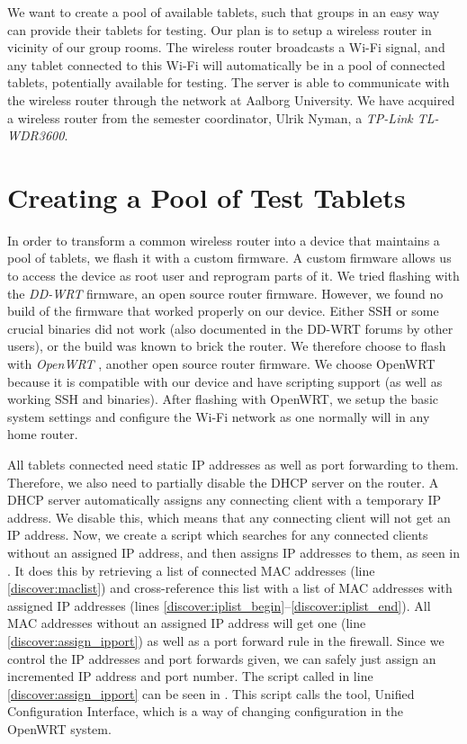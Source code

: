 We want to create a pool of available tablets, such that groups in an easy way can provide their tablets for testing. Our plan is to setup a wireless router in vicinity of our group rooms. The wireless router broadcasts a Wi-Fi signal, and any tablet connected to this Wi-Fi will automatically be in a pool of connected tablets, potentially available for testing. The server is able to communicate with the wireless router through the network at Aalborg University. We have acquired a wireless router from the semester coordinator, Ulrik Nyman, a \emph{TP-Link TL-WDR3600}.

\section{Creating a Pool of Test Tablets}\label{sec:pool_of_tablets}
In order to transform a common wireless router into a device that maintains a pool of tablets, we flash it with a custom firmware. A custom firmware allows us to access the device as root user and reprogram parts of it. We tried flashing with the \emph{DD-WRT} \parencite{ddwrt} firmware, an open source router firmware. However, we found no build of the firmware that worked properly on our device. Either SSH or some crucial binaries did not work (also documented in the DD-WRT forums by other users), or the build was known to brick the router. We therefore choose to flash with \emph{OpenWRT} \parencite{openwrt}, another open source router firmware. We choose OpenWRT because it is compatible with our device and have scripting support (as well as working SSH and binaries). After flashing with OpenWRT, we setup the basic system settings and configure the Wi-Fi network as one normally will in any home router.

All tablets connected need static IP addresses as well as port forwarding to them. Therefore, we also need to partially disable the DHCP server on the router. A DHCP server automatically assigns any connecting client with a temporary IP address. We disable this, which means that any connecting client will not get an IP address. Now, we create a script which searches for any connected clients without an assigned IP address, and then assigns IP addresses to them, as seen in . It does this by retrieving a list of connected MAC addresses (line \ref{discover:maclist}) and cross-reference this list with a list of MAC addresses with assigned IP addresses (lines \ref{discover:iplist_begin}--\ref{discover:iplist_end}). All MAC addresses without an assigned IP address will get one (line \ref{discover:assign_ipport}) as well as a port forward rule in the firewall. Since we control the IP addresses and port forwards given, we can safely just assign an incremented IP address and port number. The script called in line \ref{discover:assign_ipport} can be seen in . This script calls the  tool, Unified Configuration Interface, which is a way of changing configuration in the OpenWRT system.

